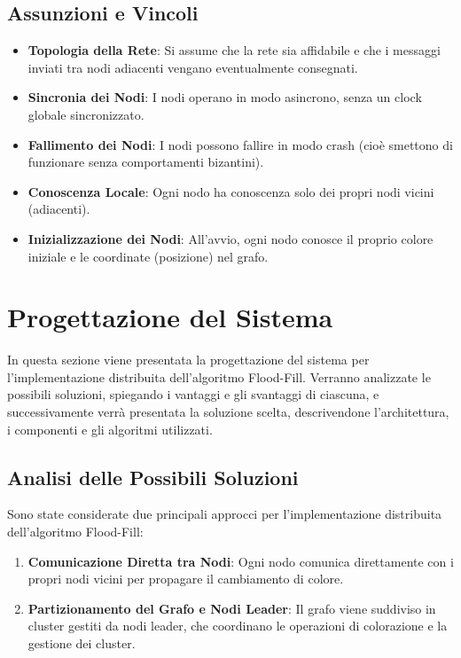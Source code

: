 \documentclass[12pt, a4paper]{report}
\begin{document}
\subsection{Assunzioni e Vincoli}

\begin{itemize}
    \item \textbf{Topologia della Rete}: Si assume che la rete sia affidabile e che i messaggi inviati tra nodi adiacenti vengano eventualmente consegnati.
    \item \textbf{Sincronia dei Nodi}: I nodi operano in modo asincrono, senza un clock globale sincronizzato.
    \item \textbf{Fallimento dei Nodi}: I nodi possono fallire in modo crash (cioè smettono di funzionare senza comportamenti bizantini).
    \item \textbf{Conoscenza Locale}: Ogni nodo ha conoscenza solo dei propri nodi vicini (adiacenti).
    \item \textbf{Inizializzazione dei Nodi}: All'avvio, ogni nodo conosce il proprio colore iniziale e le coordinate (posizione) nel grafo.
\end{itemize}

\section{Progettazione del Sistema}

In questa sezione viene presentata la progettazione del sistema per l'implementazione distribuita dell'algoritmo Flood-Fill. Verranno analizzate le possibili soluzioni, spiegando i vantaggi e gli svantaggi di ciascuna, e successivamente verrà presentata la soluzione scelta, descrivendone l'architettura, i componenti e gli algoritmi utilizzati.

\subsection{Analisi delle Possibili Soluzioni}

Sono state considerate due principali approcci per l'implementazione distribuita dell'algoritmo Flood-Fill:

\begin{enumerate}
    \item \textbf{Comunicazione Diretta tra Nodi}: Ogni nodo comunica direttamente con i propri nodi vicini per propagare il cambiamento di colore.
    \item \textbf{Partizionamento del Grafo e Nodi Leader}: Il grafo viene suddiviso in cluster gestiti da nodi leader, che coordinano le operazioni di colorazione e la gestione dei cluster.
\end{enumerate}
\end{document}
